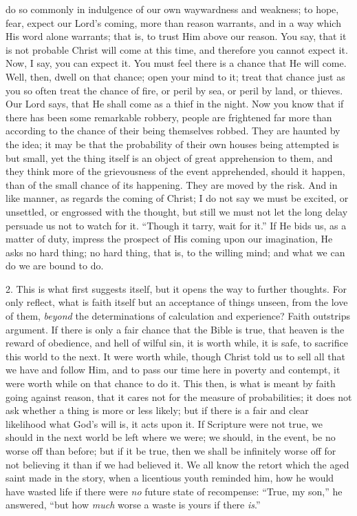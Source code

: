do so commonly in indulgence of our own waywardness and weakness; to
hope, fear, expect our Lord's coming, more than reason warrants, and
in a way which His word alone warrants; that is, to trust Him above
our reason. You say, that it is not probable Christ will come at this
time, and therefore you cannot expect it. Now, I say, you can expect
it. You must feel there is a chance that He will come. Well, then,
dwell on that chance; open your mind to it; treat that chance just as
you so often treat the chance of fire, or peril by sea, or peril by
land, or thieves. Our Lord says, that He shall come as a thief in the
night. Now you know that if there has been some remarkable robbery,
people are frightened far more than according to the chance of their
being themselves robbed. They are haunted by the idea; it may be that
the probability of their own houses being attempted is but small, yet
the thing itself is an object of great apprehension to them, and they
think more of the grievousness of the event apprehended, should it
happen, than of the small chance of its happening. They are moved by
the risk. And in like manner, as regards the coming of Christ; I do
not say we must be excited, or unsettled, or engrossed with the
thought, but still we must not let the long delay persuade us not to
watch for it. ``Though it tarry, wait for it.'' If He bids us,
as a matter of duty, impress the prospect of His coming upon our
imagination, He asks no hard thing; no hard thing, that is, to the
willing mind; and what we can do we are bound to do.

2. This is what first suggests itself, but it opens the way to
further thoughts. For only reflect, what is faith itself but an
acceptance of things unseen, from the love of them, \emph{beyond} the
determinations of calculation and experience? Faith outstrips
argument. If there is only a fair chance that the Bible is true, that
heaven is the reward of obedience, and hell of wilful sin, it is worth
while, it is safe, to sacrifice this world to the next. It were worth
while, though Christ told us to sell all that we have and follow Him,
and to pass our time here in poverty and contempt, it were worth while
on that chance to do it. This then, is what is meant by faith going
against reason, that it cares not for the measure of probabilities; it
does not ask whether a thing is more or less likely; but if there is a
fair and clear likelihood what God's will is, it acts upon it. If
Scripture were not true, we should in the next world be left where we
were; we should, in the event, be no worse off than before; but if it
be true, then we shall be infinitely worse off for not believing it
than if we had believed it. We all know the retort which the aged
saint made in the story, when a licentious youth reminded him, how he
would have wasted life if there were \emph{no} future state of
recompense: ``True, my son,'' he answered, ``but how \emph{much}
worse a waste is yours if there \emph{is}.''

